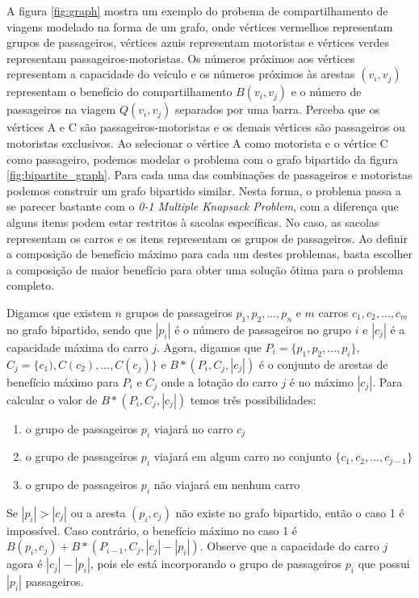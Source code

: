 \documentclass{article}
\begin{document}
A figura \ref{fig:graph} mostra um exemplo do probema de compartilhamento de viagens modelado na forma de um grafo, onde vértices
vermelhos representam grupos de passageiros, vértices azuis representam motoristas e vértices verdes representam passageiros-motoristas. Os números
próximos aos vértices representam a capacidade do veículo e os números próximos às arestas $ (v_i, v_j) $ representam o 
benefício do compartilhamento $ B(v_i, v_j) $ e o número de passageiros na viagem $ Q(v_i, v_j) $ separados por uma barra.
Perceba que os vértices A e C são passageiros-motoristas e os demais vértices são passageiros ou motoristas exclusivos. Ao selecionar 
o vértice A como motorista e o vértice C como passageiro, podemos modelar o problema com o grafo bipartido da figura \ref{fig:bipartite_graph}.
Para cada uma das combinações de passageiros e motoristas podemos construir um grafo bipartido similar. Nesta forma, o problema passa a se parecer
bastante com o \textit{0-1 Multiple Knapsack Problem}, com a diferença que alguns items podem estar restritos à sacolas específicas. No caso, as sacolas
representam os carros e os itens representam os grupos de passageiros. Ao definir a composição de benefício máximo para cada um destes problemas,
basta escolher a composição de maior benefício para obter uma solução ótima para o problema completo.

Digamos que existem $ n $ grupos de passageiros $ {p_1, p_2, ..., p_n} $ e $ m $ carros $ {c_1, c_2, ..., c_m} $ no grafo bipartido, 
sendo que $ |p_i| $ é o número de passageiros no grupo $ i $ e $ |c_j| $ é a capacidade máxima do carro $ j $. Agora, digamos
que $ P_i = \{ p_1, p_2, ..., p_i \} $, $ C_j = \{ c_1), C(c_2), ..., C(c_j) \} $ e $ B*(P_i, C_j, |c_j|) $ é o conjunto de arestas de 
benefício máximo para $ P_i $ e $ C_j $ onde a lotação do carro $ j $ é no máximo $ |c_j| $. Para calcular o 
valor de $ B*(P_i, C_j, |c_j|) $ temos três possibilidades:

\begin{enumerate}  
\item o grupo de passageiros $ p_i $ viajará no carro $ c_j $
\item o grupo de passageiros $ p_i $ viajará em algum carro no conjunto $ \{c_1, c_2, ..., c_{j - 1} \} $
\item o grupo de passageiros $ p_i $ não viajará em nenhum carro
\end{enumerate}

Se $ |p_i| > |c_j|$ ou a aresta $ (p_i, c_j) $ não existe no grafo bipartido, então o caso 1 é impossível. 
Caso contrário, o benefício máximo no caso 1 é $ B(p_i, c_j) + B*(P_{i-1}, C_j, |c_j| - |p_i|) $. Observe
que a capacidade do carro $ j $ agora é $ |c_j| - |p_i| $, pois ele está incorporando o grupo de passageiros 
$ p_i $ que possui $ |p_i| $ passageiros.
\end{document}
